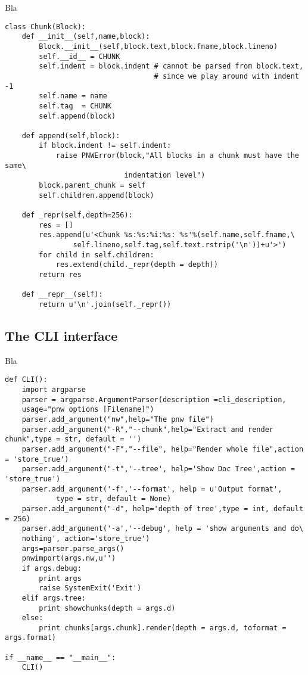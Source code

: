 \documentclass[neutral,proc,reqno]{ml-gen}
\begin{document}
Bla

\begin{lstlisting}
class Chunk(Block):
    def __init__(self,name,block):
        Block.__init__(self,block.text,block.fname,block.lineno)
        self.__id__ = CHUNK
        self.indent = block.indent # cannot be parsed from block.text, 
                                   # since we play around with indent -1
        self.name = name
        self.tag  = CHUNK
        self.append(block)

    def append(self,block):
        if block.indent != self.indent:
            raise PNWError(block,"All blocks in a chunk must have the same\
                            indentation level")
        block.parent_chunk = self
        self.children.append(block)

    def _repr(self,depth=256):
        res = []
        res.append(u'<Chunk %s:%s:%i:%s: %s'%(self.name,self.fname,\
                self.lineno,self.tag,self.text.rstrip('\n'))+u'>')
        for child in self.children:
            res.extend(child._repr(depth = depth))
        return res    

    def __repr__(self):
        return u'\n'.join(self._repr())
\end{lstlisting}
\subsection{The CLI interface}

Bla

\begin{lstlisting}
def CLI():
    import argparse
    parser = argparse.ArgumentParser(description =cli_description,
    usage="pnw options [Filename]")
    parser.add_argument("nw",help="The pnw file")
    parser.add_argument("-R","--chunk",help="Extract and render chunk",type = str, default = '')
    parser.add_argument("-F","--file", help="Render whole file",action = 'store_true')
    parser.add_argument("-t",'--tree', help='Show Doc Tree',action = 'store_true')
    parser.add_argument('-f','--format', help = u'Output format',
            type = str, default = None)
    parser.add_argument("-d", help='depth of tree',type = int, default = 256)
    parser.add_argument('-a','--debug', help = 'show arguments and do\
    nothing', action='store_true')
    args=parser.parse_args()
    pnwimport(args.nw,u'')
    if args.debug:
        print args
        raise SystemExit('Exit')
    elif args.tree:
        print showchunks(depth = args.d)
    else:
        print chunks[args.chunk].render(depth = args.d, toformat = args.format)

if __name__ == "__main__":
    CLI()
\end{lstlisting}
\end{document}
